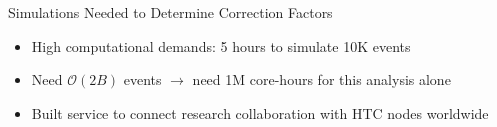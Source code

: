 \documentclass[aspectratio=169]{beamer}
\begin{document}
\begin{frame}{Simulations Needed to Determine Correction Factors}
                  \begin{itemize}
                        \item   High computational demands: 5 hours to simulate 10K events
    \item Need $\mathcal{O}(2B)$ events $\rightarrow$ need 1M core-hours for this analysis alone
    \item Built service to connect research collaboration with HTC nodes worldwide

                    \end{itemize}

\end{frame}
\end{document}

